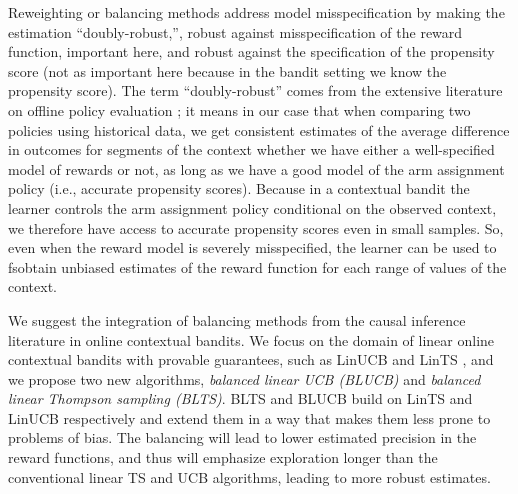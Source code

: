 \documentclass[letterpaper]{article} %
\begin{document}
Reweighting or balancing methods address model misspecification by making the estimation ``doubly-robust,'', robust against misspecification of the reward function, important here, and robust against the specification of the propensity score (not as important here because in the bandit setting we know the propensity score).  The term ``doubly-robust'' comes from the extensive literature on offline policy evaluation \cite{scharfstein1999adjusting}; it means in our case that when comparing two policies using historical data, we get consistent estimates of the average difference in outcomes for segments of the context whether we have either a well-specified model of rewards  or not, as long as we   have a good model of the arm assignment policy (i.e., accurate propensity scores). Because in a contextual bandit the learner controls the arm assignment policy conditional on the observed context,  we therefore  have access to accurate propensity scores even in small samples. So, even when the reward model is severely misspecified,  the learner can be used to fsobtain unbiased estimates of the reward function for each range of values of the context. 

We suggest the integration of balancing methods from the causal inference literature \cite{imbens-ci} in online contextual bandits.
We focus on the domain of linear online contextual bandits with provable guarantees, such as LinUCB \cite{li-linucb} and LinTS \cite{agrawal-lints}, and we propose two new algorithms, \textit{balanced linear UCB (BLUCB)} and \textit{balanced linear Thompson sampling (BLTS)}. 
BLTS and BLUCB build on LinTS and LinUCB respectively and extend them
in a way that makes them less prone to problems of bias. The balancing will lead to lower estimated precision in the reward functions, and thus will emphasize exploration longer than the conventional linear TS and UCB algorithms, leading to more robust estimates.
\end{document}
